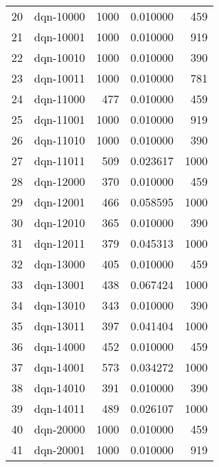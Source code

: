 \documentclass{article}
\begin{document}
\begin{table}
\begin{tabular}{llrrr}
20  &            dqn-10000 &            1000 &   0.010000 &               459 \\
21  &            dqn-10001 &            1000 &   0.010000 &               919 \\
22  &            dqn-10010 &            1000 &   0.010000 &               390 \\
23  &            dqn-10011 &            1000 &   0.010000 &               781 \\
24  &            dqn-11000 &             477 &   0.010000 &               459 \\
25  &            dqn-11001 &            1000 &   0.010000 &               919 \\
26  &            dqn-11010 &            1000 &   0.010000 &               390 \\
27  &            dqn-11011 &             509 &   0.023617 &              1000 \\
28  &            dqn-12000 &             370 &   0.010000 &               459 \\
29  &            dqn-12001 &             466 &   0.058595 &              1000 \\
30  &            dqn-12010 &             365 &   0.010000 &               390 \\
31  &            dqn-12011 &             379 &   0.045313 &              1000 \\
32  &            dqn-13000 &             405 &   0.010000 &               459 \\
33  &            dqn-13001 &             438 &   0.067424 &              1000 \\
34  &            dqn-13010 &             343 &   0.010000 &               390 \\
35  &            dqn-13011 &             397 &   0.041404 &              1000 \\
36  &            dqn-14000 &             452 &   0.010000 &               459 \\
37  &            dqn-14001 &             573 &   0.034272 &              1000 \\
38  &            dqn-14010 &             391 &   0.010000 &               390 \\
39  &            dqn-14011 &             489 &   0.026107 &              1000 \\
40  &            dqn-20000 &            1000 &   0.010000 &               459 \\
41  &            dqn-20001 &            1000 &   0.010000 &               919 \\

\end{tabular}
\end{table}
\end{document}
